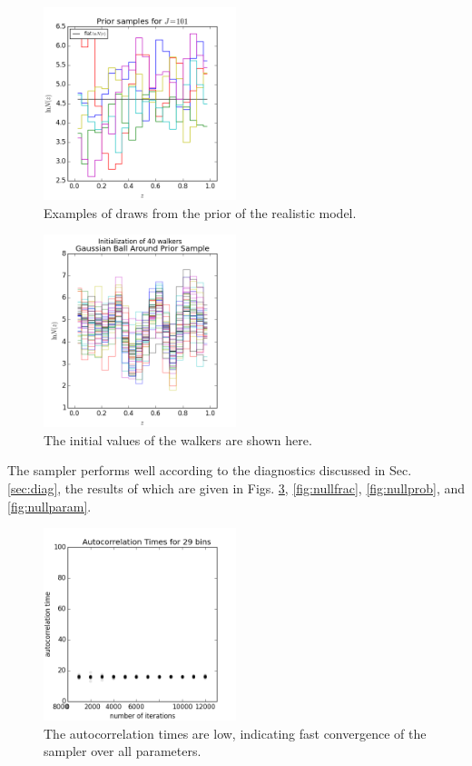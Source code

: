 \documentclass[preprint]{aastex}
\begin{document}
\begin{figure}
\includegraphics[width=0.5\textwidth]{null/priorsamps.png}
\caption{Examples of draws from the prior of the realistic model.}
\label{fig:nullprior}
\end{figure}

\begin{figure}
\includegraphics[width=0.5\textwidth]{null/initializations.png}
\caption{The initial values of the walkers are shown here.}
\label{fig:nullival}
\end{figure}

The sampler performs well according to the diagnostics discussed in Sec. 
\ref{sec:diag}, the results of which are given in Figs. \ref{fig:nullacor}, 
\ref{fig:nullfrac}, \ref{fig:nullprob}, and \ref{fig:nullparam}.  

\begin{figure}
\includegraphics[width=0.5\textwidth]{times-real.png}
\caption{The autocorrelation times are low, indicating fast convergence of the 
sampler over all parameters.}
\label{fig:nullacor}
\end{figure}
\end{document}

